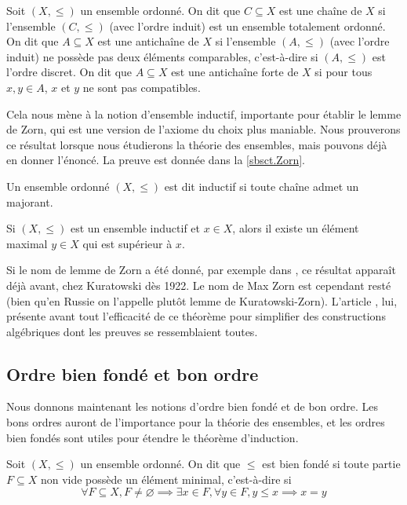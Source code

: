 \begin{definition}
  Soit $(X,\leq)$ un ensemble ordonné. On dit que $C\subseteq X$ est une chaîne
  de $X$ si l'ensemble $(C,\leq)$ (avec l'ordre induit) est un ensemble
  totalement ordonné. On dit que $A\subseteq X$ est une antichaîne de $X$ si
  l'ensemble $(A,\leq)$ (avec l'ordre induit) ne possède pas deux éléments
  comparables, c'est-à-dire si $(A,\leq)$ est l'ordre discret. On dit que
  $A\subseteq X$ est une antichaîne forte de $X$ si pour tous $x,y\in A$, $x$ et
  $y$ ne sont pas compatibles.
\end{definition}

Cela nous mène à la notion d'ensemble inductif, importante pour établir le lemme
de Zorn, qui est une version de l'axiome du choix plus maniable. Nous prouverons
ce résultat lorsque nous étudierons la théorie des ensembles, mais pouvons déjà
en donner l'énoncé. La preuve est donnée dans la \cref{sbsct.Zorn}.

\begin{definition}
  Un ensemble ordonné $(X,\leq)$ est dit inductif si toute chaîne admet un
  majorant.
\end{definition}

\begin{theorem}\label{thm.Zorn}
  Si $(X,\leq)$ est un ensemble inductif et $x\in X$, alors il existe un élément
  maximal $y \in X$ qui est supérieur à $x$.
\end{theorem}

Si le nom de lemme de Zorn a été donné, par exemple dans \cite{Tukey}, ce
résultat apparaît déjà avant, chez Kuratowski dès 1922. Le nom de Max Zorn est
cependant resté (bien qu'en Russie on l'appelle plutôt lemme de Kuratowski-Zorn).
L'article \cite{ZornLemma}, lui, présente avant tout l'efficacité de ce
théorème pour simplifier des constructions algébriques dont les preuves se
ressemblaient toutes.

\subsection{Ordre bien fondé et bon ordre}

Nous donnons maintenant les notions d'ordre bien fondé et de bon ordre. Les bons
ordres auront de l'importance pour la théorie des ensembles, et les ordres bien
fondés sont utiles pour étendre le théorème d'induction.

\begin{definition}
  Soit $(X,\leq)$ un ensemble ordonné. On dit que $\leq$ est bien fondé si toute
  partie $F\subseteq X$ non vide possède un élément minimal, c'est-à-dire si
  \[\forall F \subseteq X, F\neq \varnothing \implies \exists x\in F,
  \forall y\in F, y\leq x \implies x = y\]
\end{definition}

